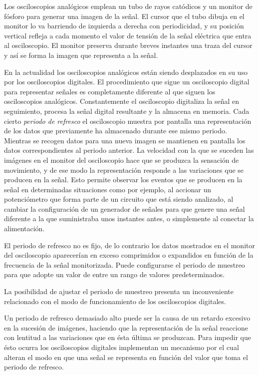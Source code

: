 Los osciloscopios analógicos emplean un tubo de rayos catódicos y un monitor de fósforo para generar una imagen de la señal. El cursor que el tubo dibuja en el monitor lo va barriendo de izquierda a derecha con periodicidad, y su posición vertical refleja a cada momento el valor de tensión de la señal eléctrica que entra al osciloscopio. El monitor preserva durante breves instantes una traza del cursor y así se forma la imagen que representa a la señal.\par
En la actualidad los osciloscopios analógicos están siendo desplazados en su uso por los osciloscopios digitales. El procedimiento que sigue un osciloscopio digital para representar señales es completamente diferente al que siguen los osciloscopios analógicos. Constantemente el osciloscopio digitaliza la señal en seguimiento, procesa la señal digital resultante y la almacena en memoria. Cada cierto \emph{periodo de refresco} el osciloscopio muestra por pantalla una representación de los datos que previamente ha almacenado durante ese mismo periodo. Mientras se recogen datos para una nueva imagen se mantienen en pantalla los datos correspondientes al periodo anterior. La velocidad con la que se suceden las imágenes en el monitor del osciloscopio hace que se produzca la sensación de movimiento, y de ese modo la representación responde a las variaciones que se producen en la señal. Esto permite observar los eventos que se producen en la señal en determinadas situaciones como por ejemplo, al accionar un potenciómetro que forma parte de un circuito que está siendo analizado, al cambiar la configuración de un generador de señales para que genere una señal diferente a la que suministraba unos instantes antes, o simplemente al conectar la alimentación.\par
El periodo de refresco no es fijo, de lo contrario los datos mostrados en el monitor del osciloscopio aparecerían en exceso comprimidos o expandidos en función de la frecuencia de la señal monitorizada. Puede configurarse el periodo de muestreo para que adopte un valor de entre un rango de valores predeterminados. 

La posibilidad de ajustar el periodo de muestreo presenta un inconveniente relacionado con el modo de funcionamiento de los osciloscopios digitales.

Un periodo de refresco demasiado alto puede ser la causa de un retardo excesivo en la sucesión de imágenes, haciendo que la representación de la señal reaccione con lentitud a las variaciones que en ésta última se produzcan. Para impedir que ésto ocurra los osciloscopios digitales implementan un mecanismo por el cual alteran el modo en que una señal se representa en función del valor que toma el periodo de refresco.

